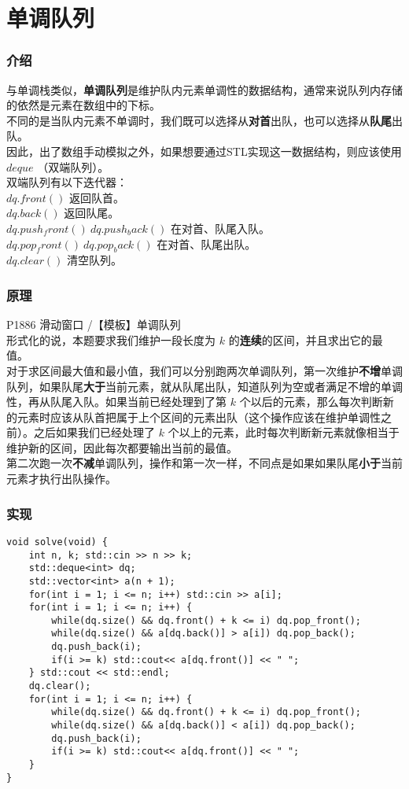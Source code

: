 \documentclass{beamer}
\newcommand{\fdf}[1]{\alert{\textbf{#1}}}
\begin{document}
\section{单调队列}
\begin{frame}
\frametitle{介绍}
与单调栈类似，\fdf{单调队列}是维护队内元素单调性的数据结构，通常来说队列内存储的依然是元素在数组中的下标。\\ 
不同的是当队内元素不单调时，我们既可以选择从\fdf{对首}出队，也可以选择从\fdf{队尾}出队。\\ 
因此，出了数组手动模拟之外，如果想要通过STL实现这一数据结构，则应该使用	 $deque$ （双端队列）。\\
双端队列有以下迭代器：\\ 
$dq.front()$ 返回队首。\\ 
$dq.back()$ 返回队尾。 \\ 
$dq.push_front() \ dq.push_back()$ 在对首、队尾入队。 \\ 
$dq.pop_front() \ dq.pop_back()$ 在对首、队尾出队。 \\ 
$dq.clear()$ 清空队列。
\end{frame}
\begin{frame}
\frametitle{原理}
P1886 滑动窗口 /【模板】单调队列\\
形式化的说，本题要求我们维护一段长度为 $k$ 的\fdf{连续}的区间，并且求出它的最值。\\
对于求区间最大值和最小值，我们可以分别跑两次单调队列，第一次维护\fdf{不增}单调队列，如果队尾\fdf{大于}当前元素，就从队尾出队，知道队列为空或者满足不增的单调性，再从队尾入队。如果当前已经处理到了第 $k$ 个以后的元素，那么每次判断新的元素时应该从队首把属于上个区间的元素出队（这个操作应该在维护单调性之前）。之后如果我们已经处理了 $k$ 个以上的元素，此时每次判断新元素就像相当于维护新的区间，因此每次都要输出当前的最值。\\ 
第二次跑一次\fdf{不减}单调队列，操作和第一次一样，不同点是如果如果队尾\fdf{小于}当前元素才执行出队操作。
\end{frame}
\begin{frame}[fragile]
\frametitle{实现}
\begin{onlyenv}
\begin{verbatim}
void solve(void) {
    int n, k; std::cin >> n >> k;
    std::deque<int> dq;
    std::vector<int> a(n + 1);
    for(int i = 1; i <= n; i++) std::cin >> a[i];
    for(int i = 1; i <= n; i++) {
        while(dq.size() && dq.front() + k <= i) dq.pop_front();
        while(dq.size() && a[dq.back()] > a[i]) dq.pop_back();
        dq.push_back(i);
        if(i >= k) std::cout<< a[dq.front()] << " ";
    } std::cout << std::endl;
    dq.clear();
    for(int i = 1; i <= n; i++) {
        while(dq.size() && dq.front() + k <= i) dq.pop_front();
        while(dq.size() && a[dq.back()] < a[i]) dq.pop_back();
        dq.push_back(i);
        if(i >= k) std::cout<< a[dq.front()] << " ";
    }
}
\end{verbatim}
\end{onlyenv}
\end{frame}
\end{document}
